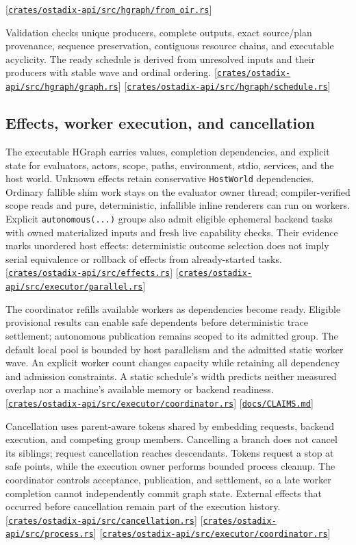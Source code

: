 \documentclass[11pt,oneside]{article}
\newcommand{\src}[1]{\textcolor{OSlate}{\scriptsize[\href{https://github.com/lostadi/OSTADIX/blob/c0b02c326b2329a95ba52447c7180bc93957cd57/#1}{\nolinkurl{#1}}]}\allowbreak}
\begin{document}
\src{crates/ostadix-api/src/hgraph/from_oir.rs}

Validation checks unique producers, complete outputs, exact source/plan
provenance, sequence preservation, contiguous resource chains, and executable
acyclicity. The ready schedule is derived from unresolved inputs and their
producers with stable wave and ordinal ordering.
\src{crates/ostadix-api/src/hgraph/graph.rs}
\src{crates/ostadix-api/src/hgraph/schedule.rs}

\subsection{Effects, worker execution, and cancellation}

The executable HGraph carries values, completion dependencies, and explicit
state for evaluators, actors, scope, paths, environment, stdio, services, and
the host world. Unknown effects retain conservative \texttt{HostWorld}
dependencies. Ordinary fallible shim work stays on the evaluator owner thread;
compiler-verified scope reads and pure, deterministic, infallible inline
renderers can run on workers. Explicit \texttt{autonomous(...)} groups also
admit eligible ephemeral backend tasks with owned materialized inputs and
fresh live capability checks. Their evidence marks unordered host effects:
deterministic outcome selection does not imply serial equivalence or rollback
of effects from already-started tasks.
\src{crates/ostadix-api/src/effects.rs}
\src{crates/ostadix-api/src/executor/parallel.rs}

The coordinator refills available workers as dependencies become ready.
Eligible provisional results can enable safe dependents before deterministic
trace settlement; autonomous publication remains scoped to its admitted group.
The default local pool is bounded by host parallelism and the admitted static
worker wave. An explicit worker count changes capacity while retaining all
dependency and admission constraints. A static schedule's width predicts
neither measured overlap nor a machine's available memory or backend readiness.
\src{crates/ostadix-api/src/executor/coordinator.rs}
\src{docs/CLAIMS.md}

Cancellation uses parent-aware tokens shared by embedding requests, backend
execution, and competing group members. Cancelling a branch does not cancel
its siblings; request cancellation reaches descendants. Tokens request a stop
at safe points, while the execution owner performs bounded process cleanup.
The coordinator controls acceptance, publication, and settlement, so a late
worker completion cannot independently commit graph state. External effects
that occurred before cancellation remain part of the execution history.
\src{crates/ostadix-api/src/cancellation.rs}
\src{crates/ostadix-api/src/process.rs}
\src{crates/ostadix-api/src/executor/coordinator.rs}
\end{document}
